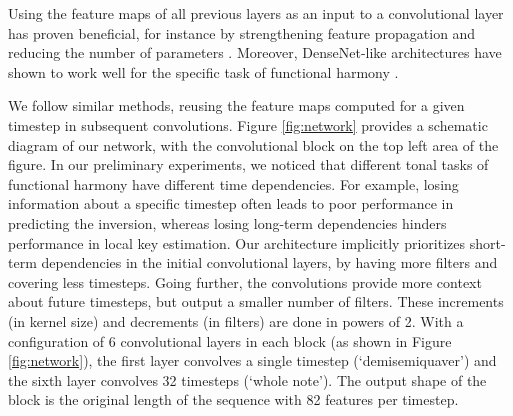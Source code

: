 

Using the feature maps of all previous layers as an input to
a convolutional layer has proven beneficial, for instance by
strengthening feature propagation and reducing the number of
parameters \parencite{huang2017densely}. Moreover, DenseNet-like
architectures have shown to work well for the specific task
of functional harmony \parencite{micchi2020not}.


We follow similar methods, reusing the feature maps computed
for a given timestep in subsequent convolutions. Figure
\ref{fig:network} provides a schematic diagram of our
network, with the convolutional block on the top left area
of the figure. In our preliminary experiments, we noticed
that different tonal tasks of functional harmony have
different time dependencies. For example, losing information
about a specific timestep often leads to poor performance in
predicting the inversion, whereas losing long-term
dependencies hinders performance in local key estimation.
Our architecture implicitly prioritizes short-term
dependencies in the initial convolutional layers, by having
more filters and covering less timesteps. Going further, the
convolutions provide more context about future timesteps,
but output a smaller number of filters. These increments (in
kernel size) and decrements (in filters) are done in powers
of 2. With a configuration of 6 convolutional layers in each
block (as shown in Figure \ref{fig:network}), the first
layer convolves a single timestep (`demisemiquaver') and the
sixth layer convolves 32 timesteps (`whole note'). The
output shape of the block is the original length of the
sequence with 82 features per timestep.
